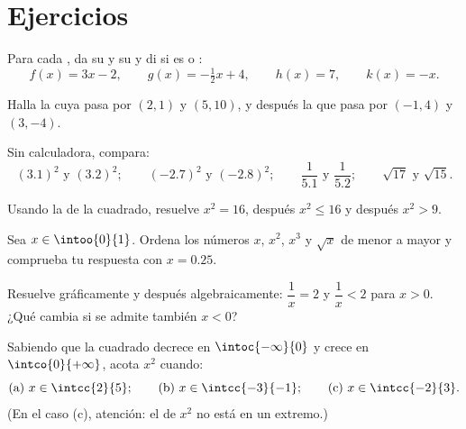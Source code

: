 \section{Ejercicios}

\begin{exercise}[$\star$]\label{exo:g10:reffunc:1}
Para cada , da su  y su  y di si
es  o :
\[
f(x) = 3x - 2, \qquad
g(x) = -\tfrac12 x + 4, \qquad
h(x) = 7, \qquad
k(x) = -x .
\]
\end{exercise}

\begin{exercise}[$\star$]\label{exo:g10:reffunc:2}
Halla la  cuya  pasa por $(2, 1)$ y $(5, 10)$, y
después la que pasa por $(-1, 4)$ y $(3, -4)$.
\end{exercise}

\begin{exercise}[$\star$]\label{exo:g10:reffunc:3}
Sin calculadora, compara:
\[
(3.1)^2 \text{ y } (3.2)^2; \qquad
(-2.7)^2 \text{ y } (-2.8)^2; \qquad
\frac{1}{5.1} \text{ y } \frac{1}{5.2}; \qquad
\sqrt{17} \text{ y } \sqrt{15}.
\]
\end{exercise}

\begin{exercise}[$\star$]\label{exo:g10:reffunc:4}
Usando la  de la  cuadrado, resuelve $x^2 = 16$, después
$x^2 \leq 16$ y después $x^2 > 9$.
\end{exercise}

\begin{exercise}[$\star$]\label{exo:g10:reffunc:5}
Sea $x \in \intoo{0}{1}$. Ordena los números $x$, $x^2$, $x^3$ y $\sqrt x$
de menor a mayor y comprueba tu respuesta con $x = 0.25$.
\end{exercise}

\begin{exercise}[$\star\star$]\label{exo:g10:reffunc:6}
Resuelve gráficamente y después algebraicamente: $\dfrac1x = 2$ y
$\dfrac1x < 2$ para $x > 0$. ¿Qué cambia si se admite también $x < 0$?
\end{exercise}

\begin{exercise}[$\star\star$]\label{exo:g10:reffunc:7}
Sabiendo que la  cuadrado decrece en $\intoc{-\infty}{0}$ y crece
en $\intco{0}{+\infty}$, acota $x^2$ cuando:
\[
\text{(a) } x \in \intcc{2}{5};
\qquad
\text{(b) } x \in \intcc{-3}{-1};
\qquad
\text{(c) } x \in \intcc{-2}{3}.
\]
(En el caso (c), atención: el  de $x^2$ no está en un extremo.)
\end{exercise}

